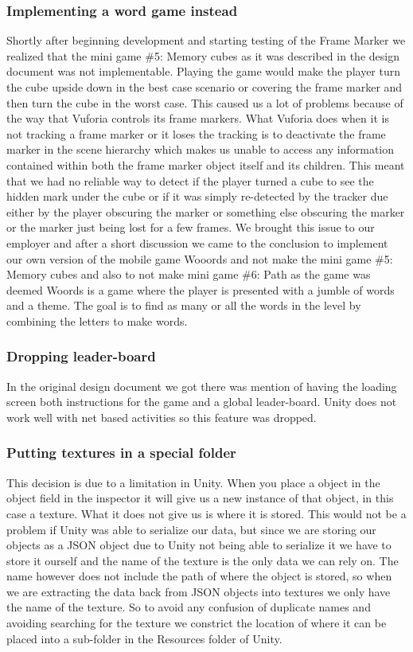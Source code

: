 \subsubsection{Implementing a word game instead}
Shortly after beginning development and starting testing of the \gls{Frame Marker} we realized that the mini game \#5: Memory cubes as it was described in the design document was not implementable. Playing the game would make the player turn the cube upside down in the best case scenario or covering the frame marker and then turn the cube in the worst case. This caused us a lot of problems because of the way that Vuforia controls its frame markers. What Vuforia does when it is not tracking a frame marker or it loses the tracking is to deactivate the frame marker in the scene hierarchy which makes us unable to access any information contained within both the frame marker object itself and its children. This meant that we had no reliable way to detect if the player turned a cube to see the hidden mark under the cube or if it was simply re-detected by the tracker due either by the player obscuring the marker or something else obscuring the marker or the marker just being lost for a few frames. We brought this issue to our employer and after a short discussion we came to the conclusion to implement our own version of the mobile game Wooords and not make the mini game \#5: Memory cubes and also to not make mini game \#6: Path as the game was deemed %
Woords is a game where the player is presented with a jumble of words and a theme. The goal is to find as many or all the words in the level by combining the letters to make words.


\subsubsection{Dropping leader-board}
In the original design document we got there was mention of having the loading screen both instructions for the game and a global leader-board. Unity does not work well with net based activities 
so this feature was dropped.

\subsubsection{Putting textures in a special folder}
This decision is due to a limitation in Unity. When you place a object in the object field in the inspector it will give us a new instance of that object, in this case a texture. What it does not give us is where it is stored. This would not be a problem if Unity was able to serialize our data, but since we are storing our objects as a JSON object due to Unity not being able to serialize it we have to store it ourself and the name of the texture is the only data we can rely on. The name however does not include the path of where the object is stored, so when we are extracting the data back from JSON objects into textures we only have the name of the texture. So to avoid any confusion of duplicate names and avoiding searching for the texture we constrict the location of where it can be placed into a sub-folder in the Resources folder of Unity.

